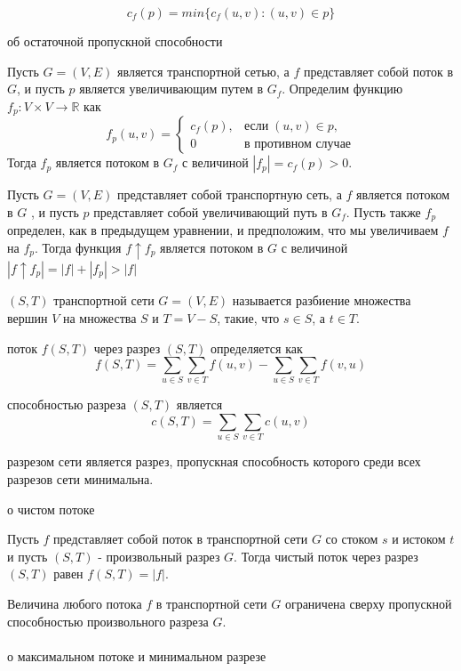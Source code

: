 \documentclass[12pt]{article}
\begin{document}
	$$c_f(p) = min\{c_f(u,v) : (u,v) \in p\}$$
	\par{ об остаточной пропускной способности}
	\par Пусть $G = (V, E)$ является транспортной сетью, а $f$ представляет собой поток в $G$, и пусть $p$ является увеличивающим путем в $G_f$. Определим функцию $f_p : V \times V \rightarrow \mathbb{R}$ как
	$$ f_p(u,v) =
	\left\{
		\begin{array}{rcl}
			c_f(p), & \mbox{если} \; (u,v) \in p, \\
			0 & \mbox{в противном случае}
		\end{array}
	 \right. $$ 
	Тогда $f_p$ является потоком в $G_f$ с величиной $|f_p| = c_f(p) > 0$.
	\par{}
	\par Пусть $G = (V, E)$ представляет собой транспортную сеть, а $f$ является потоком в $G$ , и пусть $p$ представляет собой увеличивающий путь в $G_f$. Пусть также $f_p$ определен, как в предыдущем уравнении, и предположим, что мы увеличиваем $f$ на $f_p$. Тогда функция $f \uparrow f_p$ является потоком в $G$ с величиной $|f \uparrow f_p| = |f| + |f_p| > |f|$
	\par{} $(S, T)$ транспортной сети $G = (V,E)$ называется разбиение множества вершин $V$ на множества $S$ и $T = V - S$, такие, что $s \in S$, а $t \in T$.
	\par{ поток} $f(S,T)$ через разрез $(S, T)$ определяется как
	$$ f(S,T) = \sum_{u \in S}\sum_{v \in T}f(u,v) - \sum_{u \in S}\sum_{v \in T}f(v,u) $$
	\par{ способностью разреза} $(S,T)$ является
	$$ c(S,T) = \sum_{u \in S}\sum_{v \in T}c(u,v) $$
	\par{ разрезом} сети является разрез, пропускная способность которого среди всех разрезов сети минимальна.
	\par{ о чистом потоке}
	\par Пусть $f$ представляет собой поток в транспортной сети $G$ со стоком $s$ и истоком $t$ и пусть $(S, T)$ - произвольный разрез $G$. Тогда чистый поток через разрез $(S, T)$ равен $f(S, T) = |f|$.
	\par{}
	\par Величина любого потока $f$ в транспортной сети $G$ ограничена сверху пропускной способностью произвольного разреза $G$.
	~\\
	~\\
	{\large{ о максимальном потоке и минимальном разрезе}}
\end{document}
